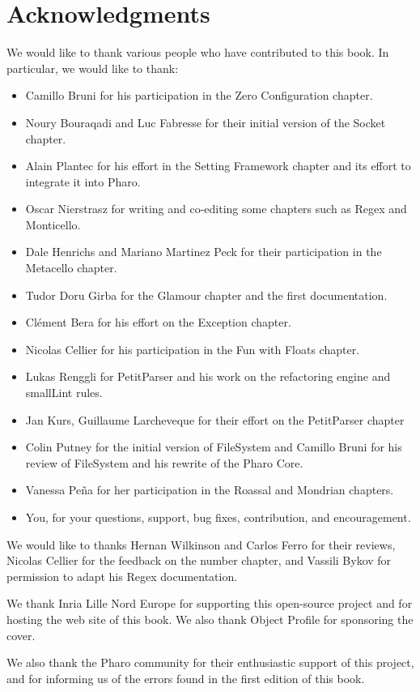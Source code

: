 \documentclass[a4paper,10pt,twoside]{book}
\begin{document}
\section*{Acknowledgments}

We would like to thank various people who have contributed to this book. In particular, we would like to thank:
\begin{itemize}
\item Camillo Bruni for his participation in the Zero Configuration chapter.
\item Noury Bouraqadi and Luc Fabresse for their initial version of the Socket chapter.
\item Alain Plantec for his effort in the Setting Framework chapter and its effort to integrate it into Pharo.
\item Oscar Nierstrasz for writing and co-editing some chapters such as Regex and Monticello.
\item Dale Henrichs and Mariano Martinez Peck for their participation in the Metacello chapter.
\item Tudor Doru Girba for the Glamour chapter and the first documentation.
\item Cl\'ement Bera for his effort on the Exception chapter.
\item Nicolas Cellier for his participation in the Fun with Floats chapter.
\item Lukas Renggli for PetitParser and his work on the refactoring engine and smallLint rules. 
\item Jan Kurs, Guillaume Larcheveque for their effort on the PetitParser chapter
\item Colin Putney for the initial version of FileSystem and Camillo Bruni for his review of FileSystem and his rewrite of the Pharo Core.
\item Vanessa Pe\~na for her participation in the Roassal and Mondrian chapters.
\item You, for your questions, support, bug fixes, contribution, and encouragement.
\end{itemize}

We would like to thanks Hernan Wilkinson and Carlos Ferro for their reviews, Nicolas Cellier for the feedback on the number chapter, and Vassili Bykov for permission to adapt his Regex documentation.

We thank Inria Lille Nord Europe for supporting this open-source project and for hosting the web site of this book. We also thank Object Profile for sponsoring the cover.

We also thank the Pharo community for their enthusiastic support of this project, and for informing us of the errors found in the first edition of this book.



\ifx\wholebook\relax\else
   
   
\end{document}
